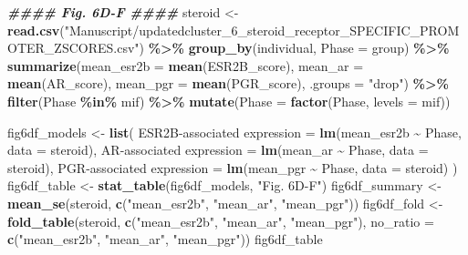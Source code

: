 \documentclass[
  landscape]{article}
\newenvironment{Shaded}{\begin{snugshade}}{\end{snugshade}}
\newcommand{\AttributeTok}[1]{\textcolor[rgb]{0.13,0.29,0.53}{#1}}
\newcommand{\DocumentationTok}[1]{\textcolor[rgb]{0.56,0.35,0.01}{\textbf{\textit{#1}}}}
\newcommand{\FunctionTok}[1]{\textcolor[rgb]{0.13,0.29,0.53}{\textbf{#1}}}
\newcommand{\NormalTok}[1]{#1}
\newcommand{\OtherTok}[1]{\textcolor[rgb]{0.56,0.35,0.01}{#1}}
\newcommand{\SpecialCharTok}[1]{\textcolor[rgb]{0.81,0.36,0.00}{\textbf{#1}}}
\newcommand{\StringTok}[1]{\textcolor[rgb]{0.31,0.60,0.02}{#1}}
\begin{document}
\begin{Shaded}
\begin{Highlighting}[]
\DocumentationTok{\#\#\#\# Fig. 6D{-}F \#\#\#\#}
\NormalTok{steroid }\OtherTok{\textless{}{-}} \FunctionTok{read.csv}\NormalTok{(}\StringTok{"Manuscript/updatedcluster\_6\_steroid\_receptor\_SPECIFIC\_PROMOTER\_ZSCORES.csv"}\NormalTok{) }\SpecialCharTok{\%\textgreater{}\%}
  \FunctionTok{group\_by}\NormalTok{(individual, }\AttributeTok{Phase =}\NormalTok{ group) }\SpecialCharTok{\%\textgreater{}\%}
  \FunctionTok{summarize}\NormalTok{(}\AttributeTok{mean\_esr2b =} \FunctionTok{mean}\NormalTok{(ESR2B\_score), }\AttributeTok{mean\_ar =} \FunctionTok{mean}\NormalTok{(AR\_score),}
            \AttributeTok{mean\_pgr =} \FunctionTok{mean}\NormalTok{(PGR\_score), }\AttributeTok{.groups =} \StringTok{"drop"}\NormalTok{) }\SpecialCharTok{\%\textgreater{}\%}
  \FunctionTok{filter}\NormalTok{(Phase }\SpecialCharTok{\%in\%}\NormalTok{ mif) }\SpecialCharTok{\%\textgreater{}\%}
  \FunctionTok{mutate}\NormalTok{(}\AttributeTok{Phase =} \FunctionTok{factor}\NormalTok{(Phase, }\AttributeTok{levels =}\NormalTok{ mif))}

\NormalTok{fig6df\_models }\OtherTok{\textless{}{-}} \FunctionTok{list}\NormalTok{(}
  \StringTok{\textasciigrave{}}\AttributeTok{ESR2B{-}associated expression}\StringTok{\textasciigrave{}} \OtherTok{=} \FunctionTok{lm}\NormalTok{(mean\_esr2b }\SpecialCharTok{\textasciitilde{}}\NormalTok{ Phase, }\AttributeTok{data =}\NormalTok{ steroid),}
  \StringTok{\textasciigrave{}}\AttributeTok{AR{-}associated expression}\StringTok{\textasciigrave{}}    \OtherTok{=} \FunctionTok{lm}\NormalTok{(mean\_ar }\SpecialCharTok{\textasciitilde{}}\NormalTok{ Phase, }\AttributeTok{data =}\NormalTok{ steroid),}
  \StringTok{\textasciigrave{}}\AttributeTok{PGR{-}associated expression}\StringTok{\textasciigrave{}}   \OtherTok{=} \FunctionTok{lm}\NormalTok{(mean\_pgr }\SpecialCharTok{\textasciitilde{}}\NormalTok{ Phase, }\AttributeTok{data =}\NormalTok{ steroid)}
\NormalTok{)}
\NormalTok{fig6df\_table }\OtherTok{\textless{}{-}} \FunctionTok{stat\_table}\NormalTok{(fig6df\_models, }\StringTok{"Fig. 6D{-}F"}\NormalTok{)}
\NormalTok{fig6df\_summary }\OtherTok{\textless{}{-}} \FunctionTok{mean\_se}\NormalTok{(steroid, }\FunctionTok{c}\NormalTok{(}\StringTok{"mean\_esr2b"}\NormalTok{, }\StringTok{"mean\_ar"}\NormalTok{, }\StringTok{"mean\_pgr"}\NormalTok{))}
\NormalTok{fig6df\_fold }\OtherTok{\textless{}{-}} \FunctionTok{fold\_table}\NormalTok{(steroid, }\FunctionTok{c}\NormalTok{(}\StringTok{"mean\_esr2b"}\NormalTok{, }\StringTok{"mean\_ar"}\NormalTok{, }\StringTok{"mean\_pgr"}\NormalTok{),}
                          \AttributeTok{no\_ratio =} \FunctionTok{c}\NormalTok{(}\StringTok{"mean\_esr2b"}\NormalTok{, }\StringTok{"mean\_ar"}\NormalTok{, }\StringTok{"mean\_pgr"}\NormalTok{))}
\NormalTok{fig6df\_table}
\end{Highlighting}
\end{Shaded}
\end{document}
